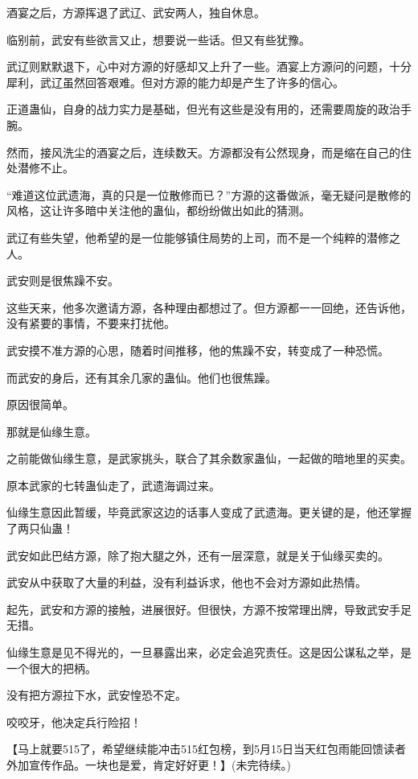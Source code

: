 \begin{this_body}
酒宴之后，方源挥退了武辽、武安两人，独自休息。

临别前，武安有些欲言又止，想要说一些话。但又有些犹豫。

武辽则默默退下，心中对方源的好感却又上升了一些。酒宴上方源问的问题，十分犀利，武辽虽然回答艰难。但对方源的能力却是产生了许多的信心。

正道蛊仙，自身的战力实力是基础，但光有这些是没有用的，还需要周旋的政治手腕。

然而，接风洗尘的酒宴之后，连续数天。方源都没有公然现身，而是缩在自己的住处潜修不止。

“难道这位武遗海，真的只是一位散修而已？”方源的这番做派，毫无疑问是散修的风格，这让许多暗中关注他的蛊仙，都纷纷做出如此的猜测。

武辽有些失望，他希望的是一位能够镇住局势的上司，而不是一个纯粹的潜修之人。

武安则是很焦躁不安。

这些天来，他多次邀请方源，各种理由都想过了。但方源都一一回绝，还告诉他，没有紧要的事情，不要来打扰他。

武安摸不准方源的心思，随着时间推移，他的焦躁不安，转变成了一种恐慌。

而武安的身后，还有其余几家的蛊仙。他们也很焦躁。

原因很简单。

那就是仙缘生意。

之前能做仙缘生意，是武家挑头，联合了其余数家蛊仙，一起做的暗地里的买卖。

原本武家的七转蛊仙走了，武遗海调过来。

仙缘生意因此暂缓，毕竟武家这边的话事人变成了武遗海。更关键的是，他还掌握了两只仙蛊！

武安如此巴结方源，除了抱大腿之外，还有一层深意，就是关于仙缘买卖的。

武安从中获取了大量的利益，没有利益诉求，他也不会对方源如此热情。

起先，武安和方源的接触，进展很好。但很快，方源不按常理出牌，导致武安手足无措。

仙缘生意是见不得光的，一旦暴露出来，必定会追究责任。这是因公谋私之举，是一个很大的把柄。

没有把方源拉下水，武安惶恐不定。

咬咬牙，他决定兵行险招！

【马上就要515了，希望继续能冲击515红包榜，到5月15日当天红包雨能回馈读者外加宣传作品。一块也是爱，肯定好好更！】(未完待续。)

\end{this_body}

